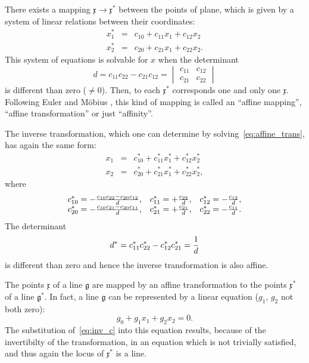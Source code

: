 \documentclass[11pt]{book} \usepackage{amssymb}
\newcommand{\myvec}[1]{\mathfrak{#1}}
\begin{document}
There exists a mapping $\myvec{x}\to \myvec{x}^*$ between the points of plane,
which is given by a system of linear relations between their coordinates:
\begin{equation}
  \label{eq:affine_trans}
  \begin{array}{rcl}
    x_1^* &=& c_{10}+c_{11}x_1+c_{12}x_2\\
    x_2^* &=& c_{20}+c_{21}x_1+c_{22}x_2.
  \end{array}
\end{equation}
This system of equations is solvable for $x$ when the determinant 
\begin{equation}
  d=c_{11}c_{22}-c_{21}c_{12}=
  \begin{vmatrix}
    c_{11} & c_{12}\\
    c_{21} & c_{22}
  \end{vmatrix}
\end{equation}
is different than zero ($\neq 0$). Then, to each $\myvec{x}^*$ corresponds 
one and only one $\myvec{x}$. Following Euler \cite{Euler:1749} and 
M\"obius \cite{Mobius:1827}, this kind of mapping
is called an ``affine mapping'', ``affine transformation'' or just ``affinity''.
 
The inverse transformation, which one can determine by 
solving~\ref{eq:affine_trans}, has again the same form: 
\begin{equation}
  \label{eq:affine_trans_inv}
  \begin{array}{rcl}
    x_1 &=& c_{10}^*+c_{11}^*x_1^*+c_{12}^*x_2^*\\
    x_2 &=& c_{20}^*+c_{21}^*x_1^*+c_{22}^*x_2^*,
  \end{array}
\end{equation}
where
\begin{equation}
  \label{eq:inv_c}
  \begin{array}{lll}
    c_{10}^*=-{c_{10}c_{22}-c_{20}c_{12} \over d},& c_{11}^*=+{c_{22}\over d},&c_{12}^*=-{c_{12}\over d},\\
    c_{20}^*=-{c_{10}c_{21}-c_{20}c_{11} \over d},& c_{21}^*=+{c_{21}\over d},&c_{22}^*=-{c_{11}\over d}.
  \end{array}
\end{equation}
The determinant
\begin{equation}
  \label{eq:inv_det}
  d^*=c_{11}^*c_{22}^*-c_{12}^*c_{21}^*={1\over d}
\end{equation}
is different than zero and hence the inverse transformation is also affine.

The points $\myvec{x}$ of a line $\mathfrak{g}$ are mapped by an affine 
transformation to
the points $\myvec{x}^*$ of a line $\mathfrak{g}^*$. In fact, a line 
$\mathfrak{g}$ can be
represented by a linear equation ($g_1$, $g_2$ not both zero):
\begin{equation}
  \label{eq:line}
  g_0+g_1x_1+g_2x_2=0.
\end{equation}
The substitution of~\ref{eq:inv_c} into this equation results, because of the
invertibilty of the transformation, in an equation which is not trivially
satisfied, and thus again the locus of $\myvec{x}^*$ is a line.
\end{document}
